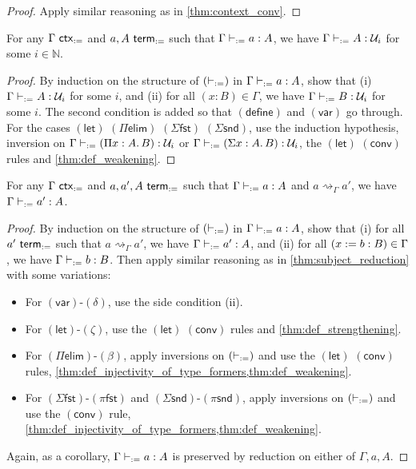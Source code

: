 \documentclass[twoside]{report}
\begin{document}
\begin{proof}
Apply similar reasoning as in \cref{thm:context_conv}.
\end{proof}

\begin{proposition}[Classification]
\label{thm:def_classification}
For any $\Gamma \ \mathsf{ctx}_{:=}$ and $a, A \ \mathsf{term}_{:=}$ such that $\Gamma \vdash_{:=} a : A$, we have $\Gamma \vdash_{:=} A : \mathcal U_i$ for some $i \in \mathbb N$.
\end{proposition}

\begin{proof}
By induction on the structure of $(\vdash_{:=})$ in $\Gamma \vdash_{:=} a : A$, show that (i) $\Gamma \vdash_{:=} A : \mathcal U_i$ for some $i$, and (ii) for all $(x : B) \in \Gamma$, we have $\Gamma \vdash_{:=} B : \mathcal U_i$ for some $i$. The second condition is added so that $(\mathsf{define})$ and $(\mathsf{var})$ go through. For the cases $(\mathsf{let})$ $(\Pi\mathsf{elim})$ $(\Sigma\mathsf{fst})$ $(\Sigma\mathsf{snd})$, use the induction hypothesis, inversion on $\Gamma \vdash_{:=} (\Pi{x} : {A}.\,{B}) : \mathcal U_i$ or $\Gamma \vdash_{:=} (\Sigma{x} : {A}.\,{B}) : \mathcal U_i$, the $(\mathsf{let})$ $(\mathsf{conv})$ rules and \cref{thm:def_weakening}.
\end{proof}

\begin{proposition}
\label{thm:def_subject_reduction}
For any $\Gamma \ \mathsf{ctx}_{:=}$ and $a, a', A \ \mathsf{term}_{:=}$ such that $\Gamma \vdash_{:=} a : A$ and $a \rightsquigarrow_\Gamma a'$, we have $\Gamma \vdash_{:=} a' : A$.
\end{proposition}

\begin{proof}
By induction on the structure of $(\vdash_{:=})$ in $\Gamma \vdash_{:=} a : A$, show that (i) for all $a' \ \mathsf{term}_{:=}$ such that $a \rightsquigarrow_\Gamma a'$, we have $\Gamma \vdash_{:=} a' : A$, and (ii) for all $(x := b : B) \in \Gamma$, we have $\Gamma \vdash_{:=} b : B$. Then apply similar reasoning as in \cref{thm:subject_reduction} with some variations:
\begin{itemize}[noitemsep]
    \item For $(\mathsf{var})$-$(\delta)$, use the side condition (ii).
    \item For $(\mathsf{let})$-$(\zeta)$, use the $(\mathsf{let})$ $(\mathsf{conv})$ rules and \cref{thm:def_strengthening}.
    \item For $(\Pi\mathsf{elim})$-$(\mathsf{\beta})$, apply inversions on $(\vdash_{:=})$ and use the $(\mathsf{let})$ $(\mathsf{conv})$ rules, \cref{thm:def_injectivity_of_type_formers,thm:def_weakening}.
    \item For $(\Sigma\mathsf{fst})$-$(\mathsf{\pi{fst}})$ and $(\Sigma\mathsf{snd})$-$(\mathsf{\pi{snd}})$, apply inversions on $(\vdash_{:=})$ and use the $(\mathsf{conv})$ rule, \cref{thm:def_injectivity_of_type_formers,thm:def_weakening}.
\end{itemize}
Again, as a corollary, $\Gamma \vdash_{:=} a : A$ is preserved by reduction on either of $\Gamma, a, A$.
\end{proof}
\end{document}
